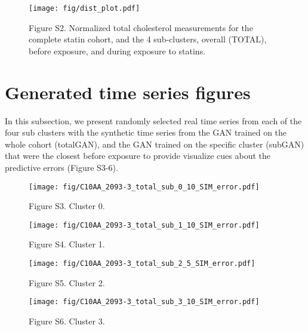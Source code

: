 \documentclass{article}
\begin{document}
\begin{figure}[h]
	\centering
	\texttt{[image: fig/dist\_plot.pdf]}
	\caption*{Figure S2. Normalized total cholesterol measurements for the complete statin cohort, and the 4 sub-clusters, overall (TOTAL), before exposure, and during exposure to statins.}
	\vspace*{-1em}
\end{figure}


\section{Generated time series figures}

In this subsection, we present randomly selected real time series from each of the four sub clusters with the synthetic time series from the GAN trained on the whole cohort (totalGAN), and the GAN trained on the specific cluster (subGAN)  that were the closest before exposure to provide visualize cues about the predictive errors (Figure S3-6).

\begin{figure}[h]
	\centering
	\texttt{[image: fig/C10AA\_2093-3\_total\_sub\_0\_10\_SIM\_error.pdf]}
	\caption*{Figure S3. Cluster 0.}
\end{figure}

\begin{figure}[h]
	\centering
	\texttt{[image: fig/C10AA\_2093-3\_total\_sub\_1\_10\_SIM\_error.pdf]}
	\caption*{Figure S4. Cluster 1.}
\end{figure}

\begin{figure}[h]
	\centering
	\texttt{[image: fig/C10AA\_2093-3\_total\_sub\_2\_5\_SIM\_error.pdf]}
	\caption*{Figure S5. Cluster 2.}
\end{figure}

\begin{figure}[h]
	\centering
	\texttt{[image: fig/C10AA\_2093-3\_total\_sub\_3\_10\_SIM\_error.pdf]}
	\caption*{Figure S6. Cluster 3.}
\end{figure}
\end{document}
